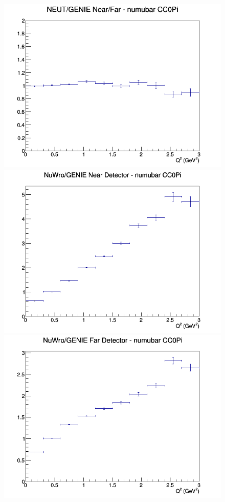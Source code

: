 \documentclass[12pt]{article}
\begin{document}
\begin{figure}[h]
\endminipage
{}
\includegraphics[width=\linewidth]{Q2/nominal/ratios/CC0Pi_NEUT_GENIE_numubar_NF_Q2.png}
\endminipage
\newline
{}
\includegraphics[width=\linewidth]{Q2/nominal/ratios/CC0Pi_NuWro_GENIE_numubar_near_Q2.png}
\endminipage
{}
\includegraphics[width=\linewidth]{Q2/nominal/ratios/CC0Pi_NuWro_GENIE_numubar_far_Q2.png}

\end{figure}
\end{document}
